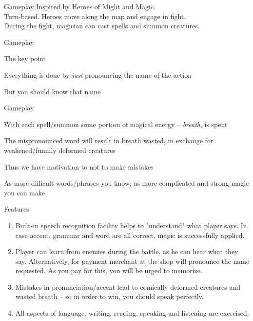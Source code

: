 \documentclass[pdf]{beamer}
\newcommand{\red}[1]{{\color[rgb]{0.6,0,0}#1}}
\begin{document}
\begin{frame}{Gameplay}
Inspired by Heroes of Might and Magic.\\\pause
Turn-based. Heroes move along the map and engage in \red{fight}. \\\pause
During the fight, magician can cast spells and summon creatures.
\end{frame}
\begin{frame}{Gameplay}
	\begin{center}{\Large The \red{key point}}\end{center}\pause 
	\begin{center}Everything is done by \textit{just} pronouncing the name of the action\end{center}\pause
	\begin{center}But you should know that name\end{center}
\end{frame}
\begin{frame}{Gameplay}
	\begin{block}{}With each spell/summon some portion of magical energy -- \textit{breath}, is spent\end{block}\pause
	\begin{block}{}The mispronounced word will result in breath wasted, in exchange for weakened/funnily deformed creatures
	\end{block}\pause
	\begin{block}{}Thus we have motivation to \red{not} to make mistakes\end{block}\pause
	\begin{block}{}As more difficult words/phrases you know, as more complicated and strong magic you can make\end{block}
\end{frame}
\begin{frame}{Features}
	\begin{enumerate}
		\large
		\item Built-in speech recognition facility helps to "understand" what player says. In case accent, grammar and word
			are all correct, magic is successfully applied.
		\item Player can learn from enemies during the battle, as he can hear what they say. Alternatively, for payment
			merchant at the shop will pronounce the name requested. As you pay for this, you will be \red{urged} to
			memorize.
		\item Mistakes in pronunciation/accent lead to comically deformed creatures and wasted breath --  so in order to win,
			you should speak perfectly.
		\item All aspects of language: writing, reading, speaking and listening are exercised.
	\end{enumerate}
\end{frame}
\end{document}
